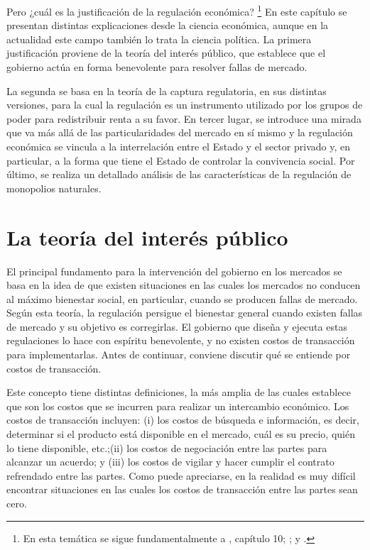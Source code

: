 \documentclass[
  12pt,
  spanish,
]{book}
\begin{document}
Pero ¿cuál es la justificación de la regulación económica? \footnote{En
  esta temática se sigue fundamentalmente a \citet{Viscusi2005},
  capítulo 10; \citet{Hertog1999}; y \citet{Noll1989}.} En este capítulo
se presentan distintas explicaciones desde la ciencia económica, aunque
en la actualidad este campo también lo trata la ciencia política. La
primera justificación proviene de la teoría del interés público, que
establece que el gobierno actúa en forma benevolente para resolver
fallas de mercado.

La segunda se basa en la teoría de la captura regulatoria, en sus
distintas versiones, para la cual la regulación es un instrumento
utilizado por los grupos de poder para redistribuir renta a su favor. En
tercer lugar, se introduce una mirada que va más allá de las
particularidades del mercado en sí mismo y la regulación económica se
vincula a la interrelación entre el Estado y el sector privado y, en
particular, a la forma que tiene el Estado de controlar la convivencia
social. Por último, se realiza un detallado análisis de las
características de la regulación de monopolios naturales.

\hypertarget{la-teoruxeda-del-interuxe9s-puxfablico}{%
\section{La teoría del interés
público}\label{la-teoruxeda-del-interuxe9s-puxfablico}}

El principal fundamento para la intervención del gobierno en los
mercados se basa en la idea de que existen situaciones en las cuales los
mercados no conducen al máximo bienestar social, en particular, cuando
se producen fallas de mercado. Según esta teoría, la regulación persigue
el bienestar general cuando existen fallas de mercado y su objetivo es
corregirlas. El gobierno que diseña y ejecuta estas regulaciones lo hace
con espíritu benevolente, y no existen costos de transacción para
implementarlas. Antes de continuar, conviene discutir qué se entiende
por costos de transacción.

Este concepto tiene distintas definiciones, la más amplia de las cuales
establece que son los costos que se incurren para realizar un
intercambio económico. Los costos de transacción incluyen: (i) los
costos de búsqueda e información, es decir, determinar si el producto
está disponible en el mercado, cuál es su precio, quién lo tiene
disponible, etc.;(ii) los costos de negociación entre las partes para
alcanzar un acuerdo; y (iii) los costos de vigilar y hacer cumplir el
contrato refrendado entre las partes. Como puede apreciarse, en la
realidad es muy difícil encontrar situaciones en las cuales los costos
de transacción entre las partes sean cero.
\end{document}

